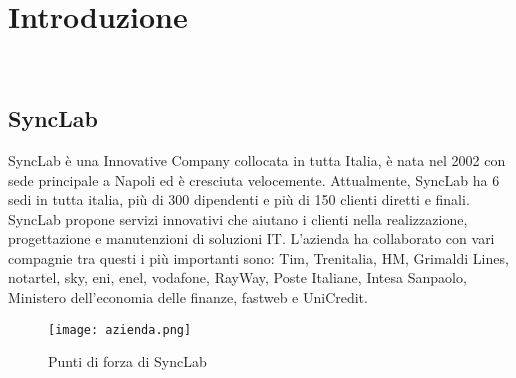 
\chapter{Introduzione}
\label{cap:introduzione}




\\
\section{SyncLab }
SyncLab è una Innovative Company collocata in tutta Italia, è nata nel 2002 con sede principale a Napoli ed è cresciuta velocemente. Attualmente, SyncLab ha 6 sedi in tutta italia, più di 300 dipendenti e più di 150 clienti diretti e finali.\\
SyncLab propone servizi innovativi che aiutano i clienti nella realizzazione, progettazione e manutenzioni di soluzioni IT.
L'azienda ha collaborato con vari compagnie tra questi i più importanti sono: Tim, Trenitalia, HM, Grimaldi Lines, notartel, sky, eni, enel, vodafone, RayWay, Poste Italiane, Intesa Sanpaolo, Ministero dell'economia delle finanze, fastweb e UniCredit.
\begin{figure}[H]
    \centering
    \texttt{[image: azienda.png]}
    \caption{Punti di forza di SyncLab}
\end{figure}
